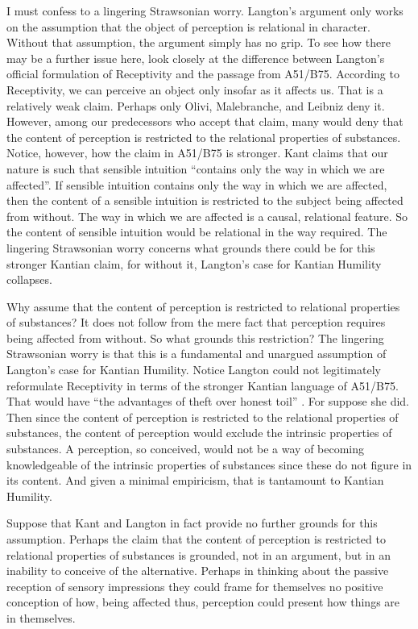 I must confess to a lingering Strawsonian worry. Langton's argument only works on the assumption that the object of perception is relational in character. Without that assumption, the argument simply has no grip. To see how there may be a further issue here, look closely at the difference between Langton's official formulation of Receptivity and the passage from A51/B75. According to Receptivity, we can perceive an object only insofar as it affects us. That is a relatively weak claim. Perhaps only Olivi, Malebranche, and Leibniz deny it. However, among our predecessors who accept that claim, many would deny that the content of perception is restricted to the relational properties of substances. Notice, however, how the claim in A51/B75 is stronger. Kant claims that our nature is such that sensible intuition ``contains only the way in which we are affected''. If sensible intuition contains only the way in which we are affected, then the content of a sensible intuition is restricted to the subject being affected from without. The way in which we are affected is a causal, relational feature. So the content of sensible intuition would be relational in the way required. The lingering Strawsonian worry concerns what grounds there could be for this stronger Kantian claim, for without it, Langton's case for Kantian Humility collapses. 

Why assume that the content of perception is restricted to relational properties of substances? It does not follow from the mere fact that perception requires being affected from without. So what grounds this restriction? The lingering Strawsonian worry is that this is a fundamental and unargued assumption of Langton's case for Kantian Humility. Notice Langton could not legitimately reformulate Receptivity in terms of the stronger Kantian language of A51/B75. That would have ``the advantages of theft over honest toil'' \citep[71]{Russell1919Introduction-to}. For suppose she did. Then since the content of perception is restricted to the relational properties of substances, the content of perception would exclude the intrinsic properties of substances. A perception, so conceived, would not be a way of becoming knowledgeable of the intrinsic properties of substances since these do not figure in its content. And given a minimal empiricism, that is tantamount to Kantian Humility. 

Suppose that Kant and Langton in fact provide no further grounds for this assumption. Perhaps the claim that the content of perception is restricted to relational properties of substances is grounded, not in an argument, but in an inability to conceive of the alternative. Perhaps in thinking about the passive reception of sensory impressions they could frame for themselves no positive conception of how, being affected thus, perception could present how things are in themselves.

